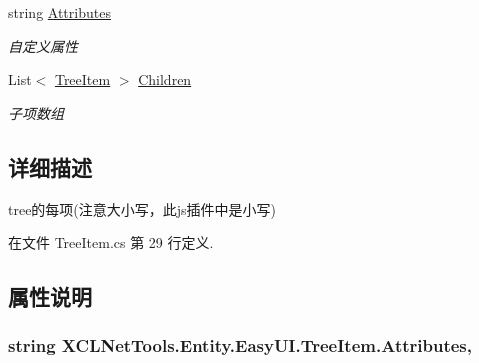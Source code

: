 \begin{DoxyCompactItemize}
string \hyperlink{class_x_c_l_net_tools_1_1_entity_1_1_easy_u_i_1_1_tree_item_a8f59dd785ca1acd2b70d5c159b711552}{Attributes}
\begin{DoxyCompactList}\small\item\em 自定义属性 \end{DoxyCompactList}\item 
List$<$ \hyperlink{class_x_c_l_net_tools_1_1_entity_1_1_easy_u_i_1_1_tree_item}{Tree\+Item} $>$ \hyperlink{class_x_c_l_net_tools_1_1_entity_1_1_easy_u_i_1_1_tree_item_a70ed6a7899043a9f8de3f28794ebd720}{Children}
\begin{DoxyCompactList}\small\item\em 子项数组 \end{DoxyCompactList}\end{DoxyCompactItemize}


\subsection{详细描述}
tree的每项(注意大小写，此js插件中是小写) 



在文件 Tree\+Item.\+cs 第 29 行定义.



\subsection{属性说明}
\subsubsection[{\texorpdfstring{Attributes}{Attributes}}]{\setlength{\rightskip}{0pt plus 5cm}string X\+C\+L\+Net\+Tools.\+Entity.\+Easy\+U\+I.\+Tree\+Item.\+Attributes\hspace{0.3cm}{\ttfamily [get]}, {\ttfamily [set]}}\hypertarget{class_x_c_l_net_tools_1_1_entity_1_1_easy_u_i_1_1_tree_item_a8f59dd785ca1acd2b70d5c159b711552}{}\label{class_x_c_l_net_tools_1_1_entity_1_1_easy_u_i_1_1_tree_item_a8f59dd785ca1acd2b70d5c159b711552}


